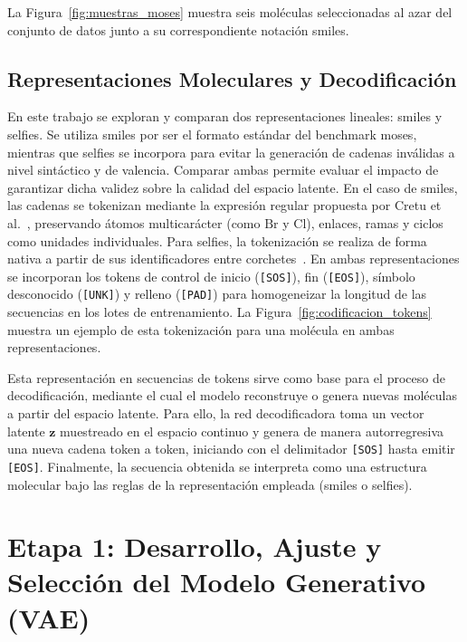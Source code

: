 

La Figura~\ref{fig:muestras_moses} muestra seis moléculas seleccionadas al azar del conjunto de datos junto a su correspondiente notación \gls{smiles}.



\subsection{Representaciones Moleculares y Decodificación}
\label{subsec:rep_solucion}

En este trabajo se exploran y comparan dos representaciones lineales: \gls{smiles} y \gls{selfies}. Se utiliza \gls{smiles} por ser el formato estándar del benchmark \gls{moses}, mientras que \gls{selfies} se incorpora para evitar la generación de cadenas inválidas a nivel sintáctico y de valencia. Comparar ambas permite evaluar el impacto de garantizar dicha validez sobre la calidad del espacio latente. En el caso de \gls{smiles}, las cadenas se tokenizan mediante la expresión regular propuesta por Cretu et al.~\cite{cretu2023standardizing}, preservando átomos multicarácter (como $\text{Br}$ y $\text{Cl}$), enlaces, ramas y ciclos como unidades individuales. Para \gls{selfies}, la tokenización se realiza de forma nativa a partir de sus identificadores entre corchetes~\cite{Krenn2019SELFIES}. En ambas representaciones se incorporan los tokens de control de inicio (\texttt{[SOS]}), fin (\texttt{[EOS]}), símbolo desconocido (\texttt{[UNK]}) y relleno (\texttt{[PAD]}) para homogeneizar la longitud de las secuencias en los lotes de entrenamiento. La Figura~\ref{fig:codificacion_tokens} muestra un ejemplo de esta tokenización para una molécula en ambas representaciones.



Esta representación en secuencias de tokens sirve como base para el proceso de decodificación, mediante el cual el modelo reconstruye o genera nuevas moléculas a partir del espacio latente. Para ello, la red decodificadora toma un vector latente $\mathbf{z}$ muestreado en el espacio continuo y genera de manera autorregresiva una nueva cadena token a token, iniciando con el delimitador \texttt{[SOS]} hasta emitir \texttt{[EOS]}. Finalmente, la secuencia obtenida se interpreta como una estructura molecular bajo las reglas de la representación empleada (\gls{smiles} o \gls{selfies}).

\section{Etapa 1: Desarrollo, Ajuste y Selección del Modelo Generativo (VAE)}
\label{sec:etapa1_vae}
\label{subsec:hiperparametros_vae}
\label{subsubsec:hiperparametros_vae}
\label{sec:vae_metodologia}
\label{sec:modelo_generativo}

